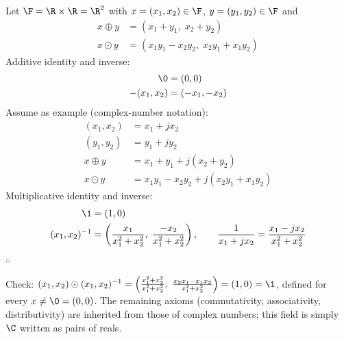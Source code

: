 \begin{example}
Let $\F=\R\times\R=\R^2$ with $x = (x_1,x_2)\in\F$, $y = (y_1,y_2)\in\F$ and
\begin{align*}
x\oplus y &= (x_1+y_1,\; x_2+y_2)\\
x\odot y &= (x_1y_1-x_2y_2,\; x_2y_1+x_1y_2)
\end{align*}
Additive identity and inverse:
\begin{align*}
\0 &= (0,0)\\
-(x_1,x_2) &= (-x_1,-x_2)
\end{align*}
Assume as example (complex-number notation):
\begin{align*}
(x_1,x_2) &= x_1+jx_2\\
(y_1,y_2) &= y_1+jy_2\\[2pt]
x\oplus y &= x_1+y_1+j(x_2+y_2)\\
x\odot y &= x_1y_1-x_2y_2+j(x_2y_1+x_1y_2)
\end{align*}
Multiplicative identity and inverse:
\begin{align*}
\1 &= (1,0)\\
(x_1,x_2)^{-1} &= \left(\frac{x_1}{x_1^2+x_2^2},\; \frac{-x_2}{x_1^2+x_2^2}\right),
\qquad \frac{1}{x_1+jx_2} = \frac{x_1-jx_2}{x_1^2+x_2^2}
\end{align*}
$\therefore$ 
\begin{insight}
Check: $(x_1,x_2)\odot(x_1,x_2)^{-1} = \left(\frac{x_1^2+x_2^2}{x_1^2+x_2^2},\ \frac{x_2x_1-x_1x_2}{x_1^2+x_2^2}\right) = (1,0)=\1$, defined for every $x\neq\0=(0,0)$. The remaining axioms (commutativity, associativity, distributivity) are inherited from those of complex numbers; this field is simply $\C$ written as pairs of reals.
\end{insight}
\end{example}

